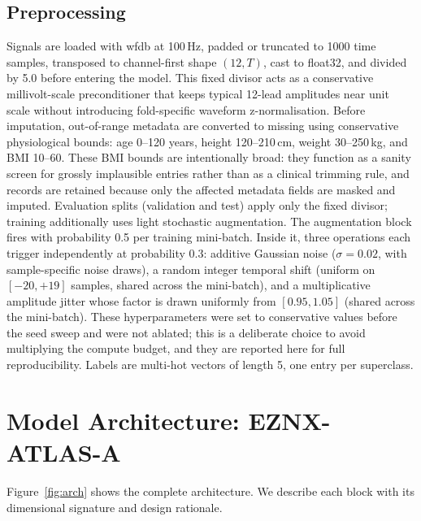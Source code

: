 \documentclass[mathematics,article,submit,pdftex]{Definitions/mdpi}
\def\texttt#1{#1}%
\begin{document}
\subsection{Preprocessing}
Signals are loaded with \texttt{wfdb} at 100\,Hz, padded or truncated to 1000 time samples, transposed to channel-first shape $(12,T)$, cast to \texttt{float32}, and divided by 5.0 before entering the model. This fixed divisor acts as a conservative millivolt-scale preconditioner that keeps typical 12-lead amplitudes near unit scale without introducing fold-specific waveform z-normalisation. Before imputation, out-of-range metadata are converted to missing using conservative physiological bounds: age 0--120 years, height 120--210\,cm, weight 30--250\,kg, and BMI 10--60. These BMI bounds are intentionally broad: they function as a sanity screen for grossly implausible entries rather than as a clinical trimming rule, and records are retained because only the affected metadata fields are masked and imputed. Evaluation splits (validation and test) apply only the fixed divisor; training additionally uses light stochastic augmentation. The augmentation block fires with probability 0.5 per training mini-batch. Inside it, three operations each trigger independently at probability 0.3: additive Gaussian noise ($\sigma{=}0.02$, with sample-specific noise draws), a random integer temporal shift (uniform on $[-20,+19]$ samples, shared across the mini-batch), and a multiplicative amplitude jitter whose factor is drawn uniformly from $[0.95, 1.05]$ (shared across the mini-batch). These hyperparameters were set to conservative values before the seed sweep and were not ablated; this is a deliberate choice to avoid multiplying the compute budget, and they are reported here for full reproducibility. Labels are multi-hot vectors of length 5, one entry per superclass.

\section{Model Architecture: EZNX-ATLAS-A}\label{sec:model}

Figure~\ref{fig:arch} shows the complete architecture. We describe each block with its dimensional signature and design rationale.
\end{document}
